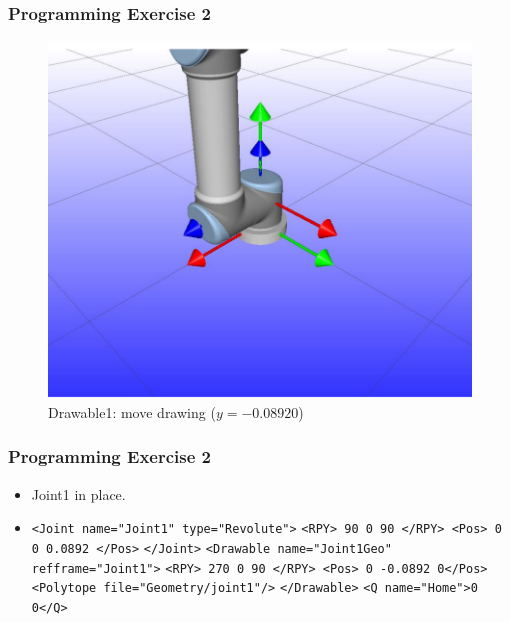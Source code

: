 \documentclass{beamer}
\begin{document}

\begin{frame}
  \frametitle{Programming Exercise 2}
  \begin{centering}
    \begin{figure}
    \includegraphics[height=0.6\textheight]{./graphics/ex33_13}
    \caption{Drawable1: move drawing ($y=-0.08920$)}
    \end{figure}
    \end{centering}
  \end{frame}
  

\begin{frame}
  \frametitle{Programming Exercise 2}
  \begin{itemize}
  \item Joint1 in place.
    \item \texttt{<Joint name="Joint1" type="Revolute">} \newline
      \texttt{<RPY> 90 0 90 </RPY> <Pos> 0 0 0.0892 </Pos>} \newline
      \texttt{</Joint>} \newline
      \texttt{<Drawable name="Joint1Geo" refframe="Joint1">} \newline
      \texttt{<RPY> 270 0 90 </RPY> <Pos> 0 -0.0892 0</Pos>} \newline
      \texttt{<Polytope file="Geometry/joint1"/>} \newline
      \texttt{</Drawable>} \newline
      \texttt{<Q name="Home">0 0</Q>}
  \end{itemize}
\end{frame}
\end{document}

